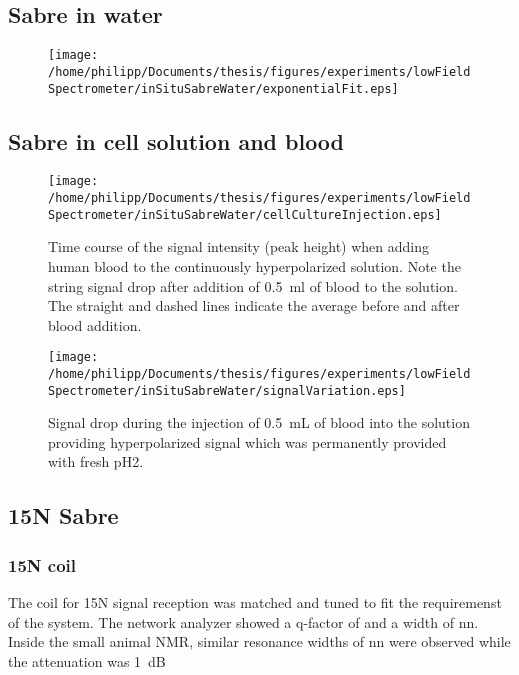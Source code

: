     \subsection{Sabre in water}
    \begin{figure}[h]
    \end{figure}
    \begin{figure}[h]
        \centering
        \texttt{[image: /home/philipp/Documents/thesis/figures/experiments/lowFieldSpectrometer/inSituSabreWater/exponentialFit.eps]}
    \end{figure}
    \subsection{Sabre in cell solution and blood}
    \begin{figure}[h]
        \texttt{[image: /home/philipp/Documents/thesis/figures/experiments/lowFieldSpectrometer/inSituSabreWater/cellCultureInjection.eps]}
        \caption{Time course of the signal intensity (peak height) when adding human blood to the continuously hyperpolarized solution. Note the string signal drop after addition of \SI{0.5}{\milli\litre} of blood to the solution. The straight and dashed lines indicate the average before and after blood addition.}
        \label{chap:MaterialsAndMethods:bloodInjection}
    \end{figure}
    \begin{figure}[h]
        \texttt{[image: /home/philipp/Documents/thesis/figures/experiments/lowFieldSpectrometer/inSituSabreWater/signalVariation.eps]}
        \label{chap:MaterialsAndMethods:bloodInjection2}
        \caption{Signal drop during the injection of \SI{0.5}{\milli\liter} of blood into the solution providing hyperpolarized signal which was permanently provided with fresh pH2.}
    \end{figure}
    \subsection{15N Sabre}
        \subsubsection{15N coil}
        The coil for 15N signal reception was matched and tuned to fit the requiremenst of the system. The network analyzer showed a q-factor of  and a width of nn. Inside the small animal NMR, similar resonance widths of nn were observed while the attenuation was \SI{1}{\deci\bel}
